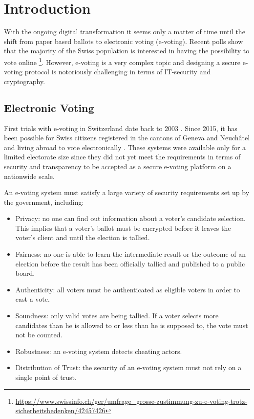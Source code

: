 \chapter{Introduction}
With the ongoing digital transformation it seems only a matter of time until the shift from paper based ballots to electronic voting (e-voting). Recent polls show that the majority of the Swiss population is interested in having the possibility to vote online \footnote{\url{https://www.swissinfo.ch/ger/umfrage_grosse-zustimmung-zu-e-voting-trotz-sicherheitsbedenken/42457426}}. However, e-voting is a very complex topic and designing a secure e-voting protocol is notoriously challenging in terms of IT-security and cryptography.

\section{Electronic Voting}
First trials with e-voting in Switzerland date back to 2003 \cite{swissinfo}. Since 2015, it has been possible for Swiss citizens registered in the cantons of Geneva and Neuchâtel and living abroad to vote electronically \cite{aso}. These systems were available only for a limited electorate size since they did not yet meet the requirements in terms of security and transparency to be accepted as a secure e-voting platform on a nationwide scale.

An e-voting system must satisfy a large variety of security requirements set up by the government, including:

\begin{itemize}
 \item Privacy: no one can find out information about a voter's candidate selection. This implies that a voter's ballot must be encrypted before it leaves the voter's client and until the election is tallied.
	\item Fairness: no one is able to learn the intermediate result or the outcome of an election before the result has been officially tallied and published to a public board.	
	\item Authenticity: all voters must be authenticated as eligible voters in order to cast a vote.
	\item Soundness: only valid votes are being tallied. If a voter selects more candidates than he is allowed to or less than he is supposed to, the vote must not be counted.
	\item Robustness: an e-voting system detects cheating actors.
	\item Distribution of Trust: the security of an e-voting system must not rely on a single point of trust.
\end{itemize} \cite{evotinganforderungen}

